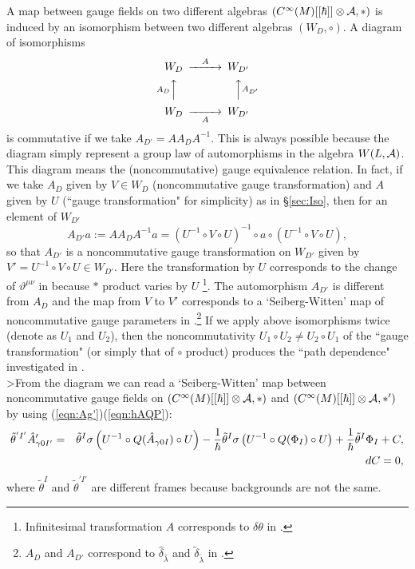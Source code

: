 \documentclass[10pt,a4paper]{article}
\def\h{\hbar}
\def\hA{{\hat A}}
\begin{document}
A map between gauge fields on two different algebras $(C^\infty(M)[[\h]]\otimes {\cal A},*)$ is induced by an isomorphism between two different algebras $(W_D,\circ)$. 
A diagram of isomorphisms 
\[
\begin{CD}
W_D        @>{A}>>           W_{D'}   \\
@A{A_D}AA                      @AA{A_{D'}}A  \\
W_D        @>>{A}>           W_{D'}
\end{CD}
\]
is commutative if we take $A_{D'}=AA_DA^{-1}$. This is always possible because the diagram simply represent a group law of automorphisms in the algebra $W(L,{\cal A})$. 
This diagram means the (noncommutative) gauge equivalence relation. In fact, if we take $A_D$ given by $V\in W_D$ (noncommutative gauge transformation) and $A$ given by $U$ (``gauge transformation" for simplicity) as in \S\ref{sec:Iso}, then for an element of $W_{D'}$
\begin{equation}
A_{D'}a:=AA_DA^{-1}a
=(U^{-1}\circ V\circ U)^{-1}\circ a \circ (U^{-1}\circ V\circ U),
\end{equation}
so that $A_{D'}$ is a noncommutative gauge transformation on $W_{D'}$ given by $V'=U^{-1}\circ V \circ U\in W_{D'}$. 
Here the transformation by $U$ corresponds to the change of $\vartheta^{\mu\nu}$ in \cite{SW}\cite{AK} because $*$ product varies by $U$
\footnote{
Infinitesimal transformation $A$ corresponds to $\delta\theta$ in \cite{AK}.
}.
The automorphism $A_{D'}$ is different from $A_D$
and the map from $V$ to $V'$ corresponds to a `Seiberg-Witten' map of noncommutative gauge parameters in \cite{SW}\cite{AK}.\footnote{
$A_D$ and $A_{D'}$ correspond to ${\hat \delta}_{\hat \lambda}$ and ${\tilde \delta}_{\tilde \lambda}$ in \cite{AK}.
} 
If we apply above isomorphisms twice (denote as $U_1$ and $U_2$), then the noncommutativity $U_1\circ U_2 \neq U_2\circ U_1$ of the ``gauge transformation" (or simply that of $\circ$ product) produces the ``path dependence" investigated in \cite{AK}.\\

>From the diagram we can read a `Seiberg-Witten' map \cite{SW}\cite{AK} between noncommutative gauge fields on $(C^\infty(M)[[\h]]\otimes {\cal A},*)$ and $(C^\infty(M)[[\h]]\otimes {\cal A},*')$ by using (\ref{eqn:Ag'})(\ref{eqn:hAQP}):
\begin{eqnarray}
\label{eqn:SWmap}
{\tilde \theta}^{'I'}\hA'_{\gamma0I'}
&=&{\tilde \theta}^I\sigma\left(U^{-1}\circ Q(\hA_{\gamma0I})\circ U\right)
-{1\over\h}{\tilde \theta}^I\sigma\left(U^{-1}\circ Q(\Phi_I)\circ U\right)
+{1\over\h}{\tilde \theta}^I\Phi_I+C,\nonumber\\
&&dC=0,
\end{eqnarray}
where ${\tilde \theta}^I$ and ${\tilde \theta}^{'I'}$ are different frames because backgrounds are not the same.
\end{document}
